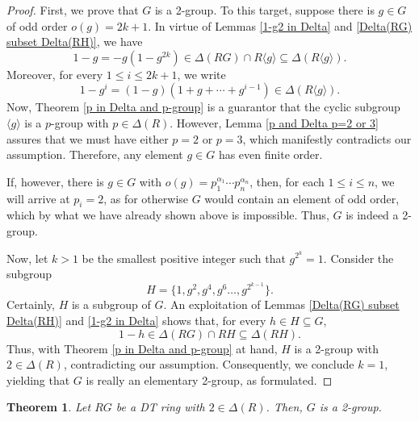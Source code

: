 \documentclass[12pt]{amsart}
\newtheorem{theorem}{Theorem}[section]
\theoremstyle{definition}
\begin{document}
\begin{proof}
First, we prove that $G$ is a 2-group. To this target, suppose there is $g \in G$ of odd order $o(g) = 2k+1$. In virtue of Lemmas \ref{1-g2 in Delta} and \ref{Delta(RG) subset Delta(RH)}, we have
\[
1 - g = -g(1 - g^{2k}) \in \Delta(RG) \cap R\langle g \rangle \subseteq \Delta(R\langle g \rangle).
\]
Moreover, for every $1 \leq i \leq 2k+1$, we write
\[
1 - g^i = (1 - g)(1 + g + \cdots + g^{i-1}) \in \Delta(R\langle g \rangle).
\]
Now, Theorem \ref{p in Delta and p-group} is a guarantor that the cyclic subgroup $\langle g \rangle$ is a $p$-group with $p \in \Delta(R)$. However, Lemma \ref{p and Delta p=2 or 3} assures that we must have either $p=2$ or $p=3$, which manifestly contradicts our assumption. Therefore, any element $g \in G$ has even finite order.

If, however, there is $g \in G$ with $o(g) = p_1^{\alpha_1}\cdots p_n^{\alpha_n}$, then, for each $1 \leq i \leq n$, we will arrive at $p_i = 2$, as for otherwise $G$ would contain an element of odd order, which by what we have already shown above is impossible. Thus, $G$ is indeed a 2-group.

Now, let $k>1$ be the smallest positive integer such that $g^{2^k} = 1$. Consider the subgroup
\[
H = \{1, g^2, g^4,g^6 \ldots, g^{2^{k-1}}\}.
\]
Certainly, $H$ is a subgroup of $G$. An exploitation of Lemmas \ref{Delta(RG) subset Delta(RH)} and \ref{1-g2 in Delta} shows that, for every $h \in H \subseteq G$,
\[
1 - h \in \Delta(RG) \cap RH \subseteq \Delta(RH).
\]
Thus, with Theorem \ref{p in Delta and p-group} at hand, $H$ is a 2-group with $2 \in \Delta(R)$, contradicting our assumption. Consequently, we conclude $k=1$, yielding that $G$ is really an elementary 2-group, as formulated.
\end{proof}

\begin{theorem}\label{G is 2-group}
Let $RG$ be a DT ring with $2 \in \Delta(R)$. Then, $G$ is a 2-group.
\end{theorem}
\end{document}
